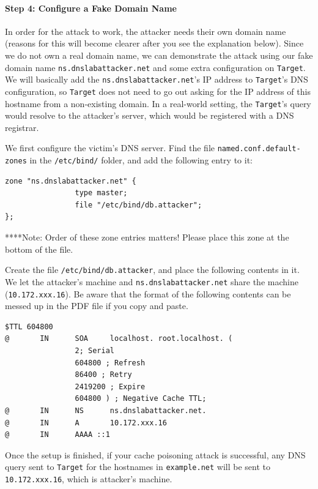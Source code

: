 \paragraph{Step 4: Configure a Fake Domain Name}
In order for the attack to work, the attacker needs their own domain name (reasons for this will become clearer after you see the explanation below).  Since we do not own a real domain name, we can demonstrate the attack using our fake domain name {\tt ns.dnslabattacker.net} and some extra configuration on {\tt Target}.  We will basically
add the {\tt ns.dnslabattacker.net}'s IP address to {\tt Target}'s DNS configuration,
so {\tt Target} does not need to go out asking for the IP address of this
hostname from a non-existing domain.  In a real-world setting, the {\tt Target}'s query would resolve to the attacker's server, which would be registered with a DNS registrar. 

We first configure the victim's DNS server. 
Find the file {\tt named.conf.default-zones} in
the {\tt /etc/bind/} folder, and add the following entry to it:

\begin{verbatim}
zone "ns.dnslabattacker.net" {
                type master;
                file "/etc/bind/db.attacker";
};
\end{verbatim}

****Note: Order of these zone entries matters! Please place this zone at the bottom of the file.

Create the file {\tt /etc/bind/db.attacker}, and place the following
contents in it. We let the attacker's machine and 
{\tt ns.dnslabattacker.net} share the machine ({\tt 10.172.xxx.16}). Be aware that the format of the following contents 
can be messed up in the PDF file if you copy and paste. 

\begin{verbatim}
$TTL 604800
@		IN		SOA		localhost. root.localhost. (
                2; Serial
                604800 ; Refresh
                86400 ; Retry
                2419200 ; Expire
                604800 ) ; Negative Cache TTL;
@		IN		NS		ns.dnslabattacker.net.
@		IN		A		10.172.xxx.16
@		IN		AAAA ::1
\end{verbatim}

Once the setup is finished, if your cache poisoning attack is successful, any 
DNS query sent to {\tt Target} for the hostnames 
in {\tt example.net} will be sent to {\tt 10.172.xxx.16}, which is 
attacker's machine. 


